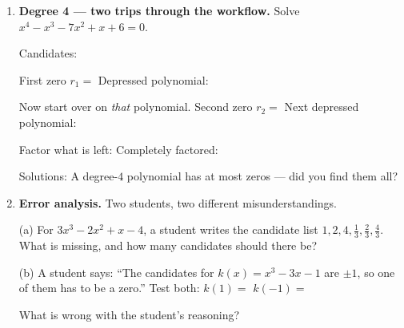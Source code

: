 \documentclass[10pt]{article}
\begin{document}
\begin{tcolorbox}[colback=white, colframe=black!40, title=\textbf{Tier A --- Approaching Proficiency},
    fonttitle=\bfseries, arc=1.5mm, left=3mm, right=3mm, top=2mm, bottom=2mm, breakable]
\begin{enumerate}[leftmargin=1.7em, itemsep=10pt]
    \vspace{2pt}
    (d) Test the one you think it is, then write $f$ completely factored:

    \vspace{2pt}
    (e) All three solutions:  \; How many synthetic divisions did the graph save you?

  \item \textbf{Degree 4 --- two trips through the workflow.} Solve $x^4 - x^3 - 7x^2 + x + 6 = 0$.

    \vspace{2pt}
    Candidates: 

    \vspace{2pt}
    First zero $r_1 = $  \; Depressed polynomial: 

    \vspace{2pt}
    Now start over on \emph{that} polynomial. Second zero $r_2 = $  \;
    Next depressed polynomial: 

    \vspace{2pt}
    Factor what is left:  \quad Completely factored: 

    \vspace{2pt}
    Solutions:  \; A degree-$4$ polynomial has at most  zeros --- did you
    find them all? 

  \item \textbf{Error analysis.} Two students, two different misunderstandings.

    \vspace{2pt}
    (a) For $3x^3 - 2x^2 + x - 4$, a student writes the candidate list $1, 2, 4, \tfrac13, \tfrac23,
    \tfrac43$. What is missing, and how many candidates should there be?

    \vspace{2pt}
    (b) A student says: ``The candidates for $k(x) = x^3 - 3x - 1$ are $\pm 1$, so one of them has
    to be a zero.'' Test both: $k(1) = $  \quad $k(-1) = $ 

    \vspace{2pt}
    What is wrong with the student's reasoning? 
\end{enumerate}
\end{tcolorbox}
\end{document}
